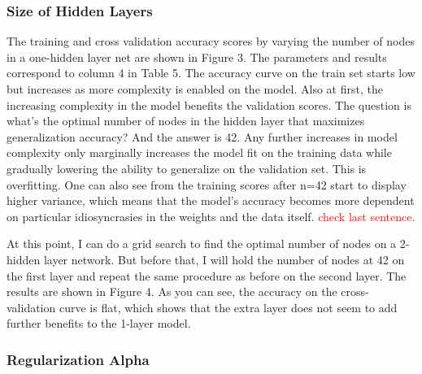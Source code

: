 \documentclass{article}
\newcommand\todo[1]{\textcolor{red}{#1}}
\begin{document}
\subsubsection*{Size of Hidden Layers}
The training and cross validation accuracy scores by varying the number of nodes in a one-hidden layer net are shown in Figure 3. The parameters and results correspond to column 4 in Table 5. The accuracy curve on the train set starts low but increases as more complexity is enabled on the model. Also at first, the increasing complexity in the model benefits the validation scores. The question is what's the optimal number of nodes in the hidden layer that maximizes generalization accuracy? And the answer is 42. Any further increases in model complexity only marginally increases the model fit on the training data while gradually lowering the ability to generalize on the validation set. This is overfitting. One can also see from the training scores after n=42 start to display higher variance, which means that the model's accuracy becomes more dependent on particular idiosyncrasies in the weights and the data itself. \todo{check last sentence.}

At this point, I can do a grid search to find the optimal number of nodes on a 2-hidden layer network. But before that, I will hold the number of nodes at 42 on the first layer and repeat the same procedure as before on the second layer. The results are shown in Figure 4. As you can see, the accuracy on the cross-validation curve is flat, which shows that the extra layer does not seem to add further benefits to the 1-layer model. 

\subsubsection*{Regularization Alpha}
\end{document}
